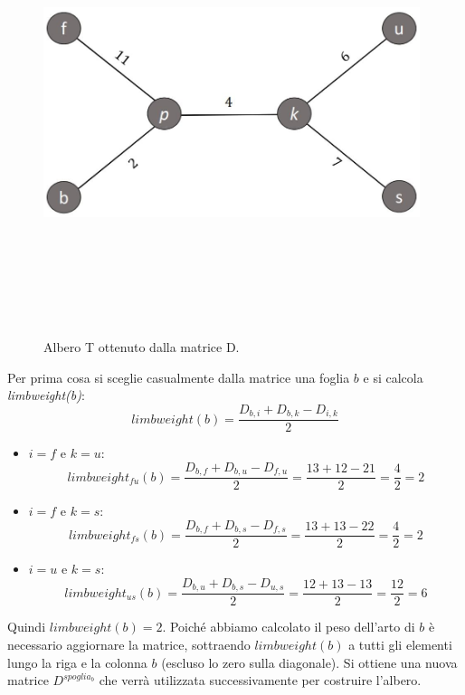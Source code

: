 \begin{figure}[h!]
\centering
	\includegraphics[height=13cm, width=11cm, keepaspectratio]{additive_tree_1.jpg}
 	\caption{Albero T ottenuto dalla matrice D.}
  	\label{fig:additivePhylogeny_1}
\end{figure}
\newline
Per prima cosa si sceglie casualmente dalla matrice una foglia $b$ e si calcola \textit{limbweight(b)}:
\[limbweight(b)=\frac{D_{b,i}+D_{b,k}-D_{i,k}}{2}\]
\begin{itemize}
	\item $i=f$ e $k=u$:
	\[limbweight_{fu}(b)=\frac{D_{b,f}+D_{b,u}-D_{f,u}}{2}=\frac{13+12-21}{2}=\frac{4}{2}=2\]
	\item $i=f$ e $k=s$:
	\[limbweight_{fs}(b)=\frac{D_{b,f}+D_{b,s}-D_{f,s}}{2}=\frac{13+13-22}{2}=\frac{4}{2}=2\]
	\item $i=u$ e $k=s$:
	\[limbweight_{us}(b)=\frac{D_{b,u}+D_{b,s}-D_{u,s}}{2}=\frac{12+13-13}{2}=\frac{12}{2}=6\]
\end{itemize}
Quindi $limbweight(b)=2$.
\newline
Poiché abbiamo calcolato il peso dell'arto di $b$ è necessario aggiornare la matrice, sottraendo $limbweight(b)$ a tutti gli elementi lungo la riga e la colonna $b$ (escluso lo zero sulla diagonale). Si ottiene una nuova matrice $D^{spoglia_{b}}$ che verrà utilizzata successivamente per costruire l'albero.
